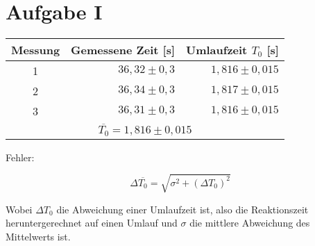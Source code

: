 \section{Aufgabe I}

\begin{table}[h!]
    \centering
    \begin{tabular}{c r r}
        \toprule
        Messung & Gemessene Zeit [s] & Umlaufzeit $T_0$ [s] \\
        \midrule
        1 & $36,32 \pm 0,3$ & $ 1,816 \pm 0,015$ \\
        2 & $36,34 \pm 0,3$ & $ 1,817 \pm 0,015$ \\
        3 & $36,31 \pm 0,3$ & $ 1,816 \pm 0,015$ \\
        \bottomrule
        \multicolumn{3}{c}{$\overline{T_0} = 1,816 \pm 0,015$}
    \end{tabular}
\end{table}
Fehler:

\begin{equation}
    \Delta \overline{T_0} = \sqrt{\sigma^2 + (\Delta T_0)^2}
\end{equation}

Wobei $\Delta T_0$ die Abweichung einer Umlaufzeit ist, also die Reaktionszeit heruntergerechnet auf einen Umlauf und $\sigma$ die
mittlere Abweichung des Mittelwerts ist.